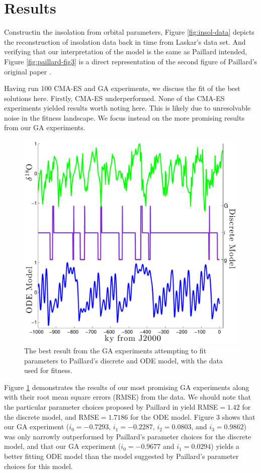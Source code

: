 \section{Results}

Constructin the insolation from orbital parameters, Figure \ref{fig:insol-data} depicts the reconstruction of insolation data back in time from Laskar's data set. And verifying that our interpretation of the model is the same as Paillard intended, Figure \ref{fig:paillard-fig3} is a direct representation of the second figure of Paillard's original paper \cite{paillard1998timing}.

Having run 100 CMA-ES and GA experiments, we discuss the fit of the best solutions here. Firstly, CMA-ES underperformed. None of the CMA-ES experiments yielded results worth noting here. This is likely due to unresolvable noise in the fitness landscape. We focus instead on the more promising results from our GA experiments.

\begin{figure}[tpb!]
\centering
  \includegraphics[width=.48\textwidth]{../src/results_plot_noname.pdf}
  \caption{
      The best result from the GA experiments attempting to fit parameters to Paillard's discrete and ODE model, with the \DO data used for fitness.
    }
  \label{fig:results}
\end{figure}

Figure \ref{fig:results} demonstrates the results of our most promising GA experiments along with their root mean square errors (RMSE) from the \DO data. We should note that the particular parameter choices proposed by Paillard in \cite{paillard1998timing} yield RMSE$=1.42$ for the discrete model, and RMSE$=1.7186$ for the ODE model. Figure 3 shows that our GA experiment ($i_{0}= -0.7293$, $i_{1}=-0.2287$, $i_{2}=0.0803$, and $i_{3}=0.9862$) was only narrowly outperformed by Paillard's parameter choices for the discrete model, and that our GA experiment ($i_{0}= -0.9677$ and $i_{1}=0.0294$) yields a better fitting ODE model than the model suggested by Paillard's parameter choices for this model.

